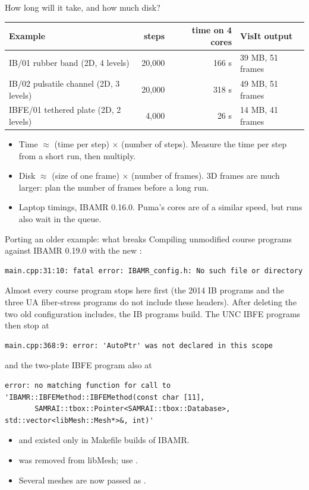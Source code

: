 \documentclass[aspectratio=169,11pt]{beamer}
\begin{document}
\begin{frame}{How long will it take, and how much disk?}
\small
\begin{tabular}{@{}L{0.40\textwidth}rrL{0.22\textwidth}@{}}
\toprule
Example & steps & time on 4 cores & VisIt output \\
\midrule
IB/01 rubber band (2D, 4 levels) & 20{,}000 & 166 s & 39 MB, 51 frames \\
IB/02 pulsatile channel (2D, 3 levels) & 20{,}000 & 318 s & 49 MB, 51 frames \\
IBFE/01 tethered plate (2D, 2 levels) & 4{,}000 & 26 s & 14 MB, 41 frames \\
\bottomrule
\end{tabular}
\vspace{3mm}
\begin{itemize}\small
  \item Time $\approx$ (time per step) $\times$ (number of steps). Measure the time per step from a short run, then multiply.
  \item Disk $\approx$ (size of one frame) $\times$ (number of frames). 3D frames are much larger: plan the number of frames before a long run.
  \item Laptop timings, IBAMR 0.16.0. Puma's cores are of a similar speed, but runs also wait in the queue.
\end{itemize}
\end{frame}

\begin{frame}[fragile]{Porting an older example: what breaks}
Compiling unmodified course programs against IBAMR 0.19.0 with the new :
\begin{lstlisting}[style=tiny]
main.cpp:31:10: fatal error: IBAMR_config.h: No such file or directory
\end{lstlisting}
\small Almost every course program stops here first (the 2014 IB programs and the three UA fiber-stress programs do not include these headers). After deleting the two old configuration includes, the IB programs build. The UNC IBFE programs then stop at
\begin{lstlisting}[style=tiny]
main.cpp:368:9: error: 'AutoPtr' was not declared in this scope
\end{lstlisting}
and the two-plate IBFE program also at
\begin{lstlisting}[style=tiny]
error: no matching function for call to 'IBAMR::IBFEMethod::IBFEMethod(const char [11],
       SAMRAI::tbox::Pointer<SAMRAI::tbox::Database>, std::vector<libMesh::Mesh*>&, int)'
\end{lstlisting}
\begin{itemize}\small
  \item {} and  existed only in Makefile builds of IBAMR.
  \item {} was removed from libMesh; use .
  \item Several meshes are now passed as .
\end{itemize}
\end{frame}
\end{document}
